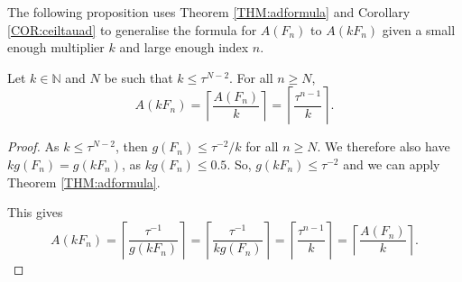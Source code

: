 \documentclass[10pt,a4paper,reqno]{amsart}
\newcommand{\N}{{\mathbb N}}
\begin{document}
The following proposition uses Theorem \ref{THM:adformula} and Corollary \ref{COR:ceiltauad} to generalise the formula for $A(F_n)$ to $A(kF_n)$ given a small enough multiplier $k$ and large enough index $n$.
\begin{prop}
Let $k\in\N$ and $N$ be such that $k\leq \tau^{N-2}$. For all $n\geq N$,
    \[A(kF_n)=\left\lceil\frac{A(F_n)}{k}\right\rceil=\left\lceil \frac{\tau^{n-1}}{k}\right\rceil.\]
\end{prop}
\begin{proof}
As $k\leq \tau^{N-2}$, then $g(F_n)\leq \tau^{-2}/k$ for all $n \geq N$. We therefore also have $kg(F_n) = g(kF_n)$, as $kg(F_n) \leq 0.5$. So, $g(kF_n) \leq \tau^{-2}$ and we can apply Theorem \ref{THM:adformula}.

This gives
\[
A(kF_n) = \left\lceil\frac{\tau^{-1}}{g(kF_n)}\right\rceil = \left\lceil\frac{\tau^{-1}}{kg(F_n)}\right\rceil = \left\lceil\frac{\tau^{n-1}}{k}\right\rceil = \left\lceil\frac{A(F_n)}{k}\right\rceil.
\]
\end{proof}
\end{document}
